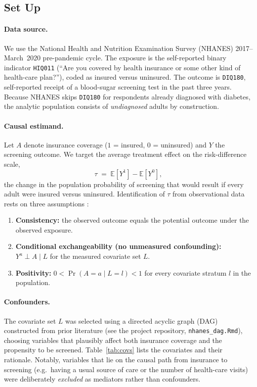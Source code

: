 \documentclass[12pt]{article}
\begin{document}
\subsection{Set Up} \label{subsec:setup}

\paragraph{Data source.} We use the National Health and Nutrition Examination
Survey (NHANES) 2017--March~2020 pre-pandemic cycle. The exposure is the
self-reported binary indicator \texttt{HIQ011} (``Are you covered by health
insurance or some other kind of health-care plan?''), coded as insured versus
uninsured. The outcome is \texttt{DIQ180}, self-reported receipt of a blood-sugar
screening test in the past three years. Because NHANES skips \texttt{DIQ180} for
respondents already diagnosed with diabetes, the analytic population consists of
\emph{undiagnosed} adults by construction.

\paragraph{Causal estimand.} Let $A$ denote insurance coverage ($1$ = insured,
$0$ = uninsured) and $Y$ the screening outcome. We target the average treatment
effect on the risk-difference scale,
\begin{equation}
\tau \;=\; \mathbb{E}\!\left[Y^{1}\right] - \mathbb{E}\!\left[Y^{0}\right],
\label{eq:ate}
\end{equation}
the change in the population probability of screening that would result if every
adult were insured versus uninsured. Identification of $\tau$ from observational
data rests on three assumptions \cite{hernan2020}:
\begin{enumerate}
\item \textbf{Consistency:} the observed outcome equals the potential outcome
under the observed exposure.
\item \textbf{Conditional exchangeability (no unmeasured confounding):}
$Y^{a} \perp A \mid L$ for the measured covariate set $L$.
\item \textbf{Positivity:} $0 < \Pr(A = a \mid L = l) < 1$ for every covariate
stratum $l$ in the population.
\end{enumerate}

\paragraph{Confounders.} The covariate set $L$ was selected using a directed
acyclic graph (DAG) constructed from prior literature (see the project
repository, \texttt{nhanes\_dag.Rmd}), choosing variables that plausibly affect
both insurance coverage and the propensity to be screened. Table~\ref{tab:covs}
lists the covariates and their rationale. Notably, variables that lie on the
causal path from insurance to screening (e.g.\ having a usual source of care or
the number of health-care visits) were deliberately \emph{excluded} as mediators
rather than confounders.
\end{document}
